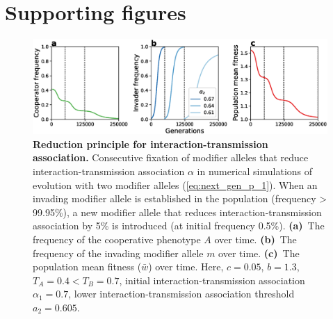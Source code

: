 \documentclass[12pt]{extarticle}
\begin{document}
\newpage
\section*{Supporting figures}


\begin{figure}[h]
  \centering
   \includegraphics[scale=0.5]{Figures/invasion.eps}
  \caption{
  \textbf{Reduction principle for interaction-transmission association.} 
  Consecutive fixation of modifier alleles that reduce interaction-transmission association $\alpha$ in numerical simulations of evolution with two modifier alleles (\autoref{eq:next_gen_p_1}).
  When an invading modifier allele is established in the population (frequency > 99.95\%), a new modifier allele that reduces interaction-transmission association by 5\% is introduced (at initial frequency 0.5\%).
  \textbf{(a)}~The frequency of the cooperative phenotype $A$ over time.
  \textbf{(b)}~The frequency of the invading modifier allele $m$ over time. 
  \textbf{(c)}~The population mean fitness ($\bar{w}$) over time.
  Here, $c = 0.05$, $b=1.3$, $T_A=0.4<T_B=0.7$, initial interaction-transmission association $\alpha_1=0.7$, lower interaction-transmission association threshold $a_2=0.605$.  
  }
  \label{fig:invasion}
\end{figure}
\end{document}
